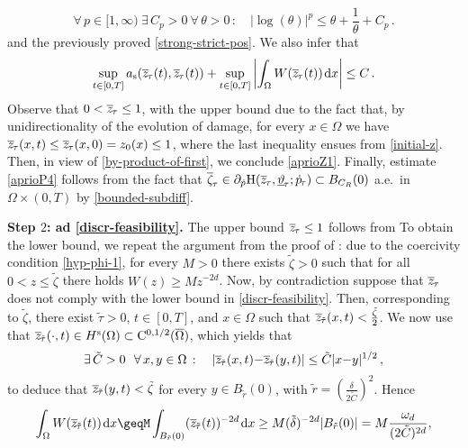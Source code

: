 \documentclass[a4paper,10pt,reqno]{amsart}
\numberwithin{equation}{section}
\numberwithin{equation}{section}
\def\dd{\;\!\mathrm{d}} %
\newcommand{\teta}{\vartheta}
\newcommand{\piecewiseConstant}[2]{\overline{#1}_{\kern-1pt#2}}
\newcommand{\pwc}{\piecewiseConstant}
\newcommand{\upiecewiseConstant}[2]{\underline{#1}_{\kern-1pt#2}}
\newcommand{\upwc}{\upiecewiseConstant}
\newcommand{\piecewiseLinear}[2]{{#1}_{\kern-1pt#2}}
\newcommand{\pwl}{\piecewiseLinear}
\newcommand{\dip}[3]{\mathrm{H}(#1,#2;#3)}
\newcommand{\spz}{H^{\mathrm{s}}(\Omega)}
\newcommand{\ass}{a_{\mathrm{s}}}
\newcommand{\EEE}{\color{black}}
\newcommand{\MMM}{\color{black}}%
\begin{document}
   \[
 \forall\, p\in [1,\infty) \ \exists\, C_p>0 \ \forall\, \theta>0 \, : \quad |\log(\theta)|^p \leq \theta + \frac1\theta + C_p\,.
 \]
 and the previously proved \eqref{strong-strict-pos}.\EEE
 We also infer that 
\begin{equation}
\label{by-product-of-first}
\sup_{t\in [0,T]} \ass (\pwc z\tau(t), \pwc z\tau(t)) + \sup_{t\in [0,T]} \left| \int_\Omega W(\pwc z\tau(t)) \dd x \right| \leq C\,.
\end{equation}
\MMM Observe that $0< \pwc z\tau \leq 1$, with the upper bound due to  the fact that, by unidirectionality of the evolution
of damage,
for every $x \in \Omega$ we have   $\pwc z\tau (x,t) \leq \pwc z\tau (x,0) = z_0(x) \leq 1$, where the last inequality ensues from
 \eqref{initial-z}.  Then, in view of \eqref{by-product-of-first}, we conclude
 \eqref{aprioZ1}. %
 \EEE
Finally, estimate \eqref{aprioP4} follows from the fact that $\pwc \zeta \tau \in \partial_{\dot p} \dip{\pwc z\tau}{\upwc \teta \tau}{\pwl{\dot p}\tau} \subset B_{C_R}(0) $ a.e.\ in $\Omega 
\times (0,T)$ by \eqref{bounded-subdiff}.
\par
\noindent 
\textbf{Step $2$: ad \eqref{discr-feasibility}.} 
The upper bound  $\pwc z\tau \leq 1$ follows from  To obtain the lower bound, 
we repeat the argument from the proof of \cite[Lemma 3.3]{Crismale-Lazzaroni}: due to the coercivity condition \eqref{hyp-phi-1}, 
for every $M>0$ there exists $\tilde{\zeta}>0 $ such that for all $0<z \leq \tilde \zeta$ there holds $W(z) \geq Mz^{-2d}$. 
Now, by contradiction suppose that $\pwc z\tau$ does not comply with the lower bound in   \eqref{discr-feasibility}. Then, 
corresponding to $\tilde\zeta$, 
there exist $\tilde\tau>0$, $t\in [0,T]$, and $x \in \Omega$ such that $\pwc z{\tilde\tau} (x,t) < \frac{\tilde \zeta}2$.
We now use that  $\pwc z{\tilde\tau}(\cdot, t) \in \spz \subset \mathrm{C}^{0,1/2}(\overline\Omega)$, which yields that 
\[
\exists\, \tilde{C}>0 \ \  \forall\, x, y\in \Omega\, : \quad |\pwc z{\tilde\tau}(x,t) {-} \pwc z{\tilde\tau}(y,t)| \leq \tilde{C}|x{-}y|^{1/2}\,,
\]
to deduce that $\pwc z{\tilde\tau}(y,t) <\tilde\zeta$ for every $y \in B_{\tilde r}(0)$, with $\tilde{r} = \left(\tfrac{\delta}{2\tilde C}\right)^2$. Hence
\[
 \int_\Omega W(\pwc z{\tilde\tau}(t)) \dd x \geq%
  M  \int_{B_{\tilde r}(0)} (\pwc z{\tilde\tau}(t))^{-2d} \dd x \geq M (\tilde\delta)^{-2d} |B_{\tilde r}(0)| = M \frac{\omega_d}{(2\tilde C)^{2d}},
\]
\end{document}
